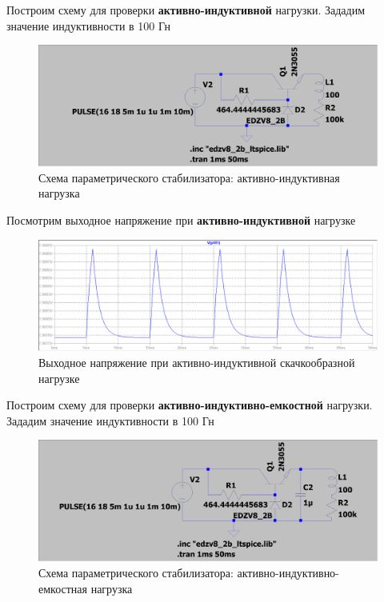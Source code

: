 \documentclass[a4paper, 12pt]{article}
\begin{document}
    \noindent Построим схему для проверки \textbf{активно-индуктивной} нагрузки. Зададим
    значение индуктивности в 100 Гн
    \begin{figure}[H]
        \centering
        \includegraphics[scale=0.22]{2task_scheme_AL.png}
        \captionsetup{skip=0pt}
        \caption{Схема параметрического стабилизатора: активно-индуктивная нагрузка}
        \label{fig:2task_scheme_AL}
    \end{figure}
    \noindent Посмотрим выходное напряжение при \textbf{активно-индуктивной} нагрузке
    \begin{figure}[H]
        \centering
        \includegraphics[scale=0.46]{2task_rect_AL.png}
        \captionsetup{skip=0pt}
        \caption{Выходное напряжение при активно-индуктивной скачкообразной нагрузке}
        \label{fig:2task_rect_AL}
    \end{figure}
    \noindent Построим схему для проверки \textbf{активно-индуктивно-емкостной} нагрузки. Зададим
    значение индуктивности в 100 Гн
    \begin{figure}[H]
        \centering
        \includegraphics[scale=0.22]{2task_scheme_ALC.png}
        \captionsetup{skip=0pt}
        \caption{Схема параметрического стабилизатора: активно-индуктивно-емкостная нагрузка}
        \label{fig:2task_scheme_ALC}
    \end{figure}
\end{document}
